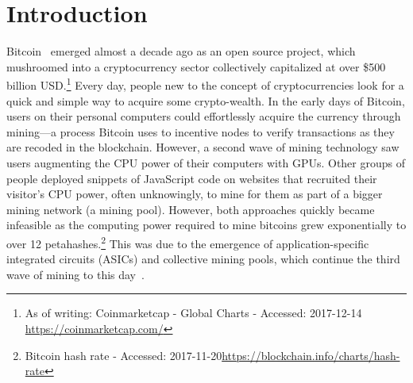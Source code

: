 

\section{Introduction}

Bitcoin~\cite{nakamoto2008bitcoin} emerged almost a decade ago as an open source project, which mushroomed into a cryptocurrency sector collectively capitalized at over \$500 billion USD.\footnote{As of writing: Coinmarketcap - Global Charts - Accessed: 2017-12-14 \url{https://coinmarketcap.com/}} Every day, people new to the concept of cryptocurrencies look for a quick and simple way to acquire some crypto-wealth. In the early days of Bitcoin, users on their personal computers could effortlessly acquire the currency through mining---a process Bitcoin uses to incentive nodes to verify transactions as they are recoded in the blockchain. However, a second wave of mining technology saw users augmenting the CPU power of their computers with GPUs. Other groups of people deployed snippets of JavaScript code on websites that recruited their visitor's CPU power, often unknowingly, to mine for them as part of a bigger mining network (\ie a mining pool). However, both approaches quickly became infeasible as the computing power required to mine bitcoins grew exponentially to over 12 petahashes.\footnote{Bitcoin hash rate - Accessed: 2017-11-20\url{https://blockchain.info/charts/hash-rate}} This was due to the emergence of application-specific integrated circuits (ASICs) and collective mining pools, which continue the third wave of mining to this day~\cite{narayanan2016}. 

